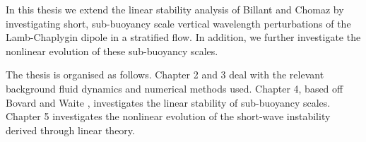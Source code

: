 In this thesis we extend the linear stability analysis of Billant and Chomaz\cite{bc2000c} by investigating short, sub-buoyancy scale vertical wavelength perturbations of the Lamb-Chaplygin dipole in a stratified flow. In addition, we further investigate the nonlinear evolution of these sub-buoyancy scales. 

The thesis is organised as follows. Chapter 2 and 3 deal with the relevant background fluid dynamics and numerical methods used. Chapter 4, based off Bovard and Waite \cite{bovard2013}, investigates the linear stability of sub-buoyancy scales. Chapter 5 investigates the nonlinear evolution of the short-wave instability derived through linear theory. 




